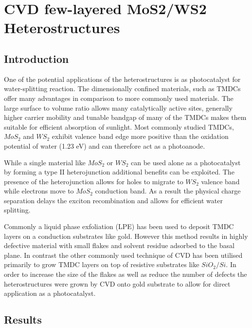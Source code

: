 \chapter{CVD few-layered MoS2/WS2 Heterostructures}
\label{cha:Heterostructures}

\section{Introduction}

One of the potential applications of the heterostructures is as photocatalyst for water-splitting reaction. The dimensionally confined materials, such as TMDCs offer many advantages in comparison to more commonly used materials. The large surface to volume ratio allows many catalytically active sites, generally higher carrier mobility and tunable bandgap of many of the TMDCs makes them suitable for efficient absorption of sunlight. Most commonly studied TMDCs, $MoS_2$ and $WS_2$ exhibit valence band edge more positive than the oxidation potential of water (1.23 eV) and can therefore act as a photoanode. 

While a single material like $MoS_2$ or $WS_2$ can be used alone as a photocatalyst by forming a type II heterojunction additional benefits can be exploited. The presence of the heterojunction allows for holes to migrate to $WS_2$ valence band while electrons move to $MoS_2$ conduction band. As a result the physical charge separation delays the exciton recombination and allows for efficient water splitting. 

Commonly a liquid phase exfoliation (LPE) has been used to deposit TMDC layers on a conduction substrates like gold. However this method results in highly defective material with small flakes and solvent residue adsorbed to the basal plane. In contrast the other commonly used technique of CVD has been utilised primarily to grow TMDC layers on top of resistive substrates like $SiO_2/Si$. In order to increase the size of the flakes as well as reduce the number of defects the heterostructures were grown by CVD onto gold substrate to allow for direct application as a photocatalyst.

\section{Results}

